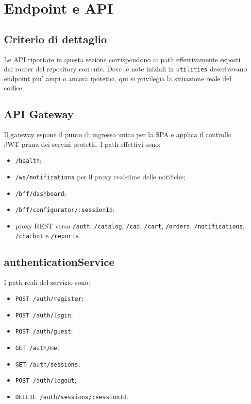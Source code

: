 \chapter{Endpoint e API}

\section{Criterio di dettaglio}

Le API riportate in questa sezione corrispondono ai path effettivamente esposti dai router del repository corrente. Dove le note iniziali in \texttt{utilities} descrivevano endpoint piu' ampi o ancora ipotetici, qui si privilegia la situazione reale del codice.

\section{API Gateway}

Il gateway espone il punto di ingresso unico per la SPA e applica il controllo JWT prima dei servizi protetti. I path effettivi sono:

\begin{itemize}
\item \texttt{/health};
\item \texttt{/ws/notifications} per il proxy real-time delle notifiche;
\item \texttt{/bff/dashboard};
\item \texttt{/bff/configurator/:sessionId};
\item proxy REST verso \texttt{/auth}, \texttt{/catalog}, \texttt{/cad}, \texttt{/cart}, \texttt{/orders}, \texttt{/notifications}, \texttt{/chatbot} e \texttt{/reports}.
\end{itemize}

\section{authenticationService}

I path reali del servizio sono:

\begin{itemize}
\item \texttt{POST /auth/register};
\item \texttt{POST /auth/login};
\item \texttt{POST /auth/guest};
\item \texttt{GET /auth/me};
\item \texttt{GET /auth/sessions};
\item \texttt{POST /auth/logout};
\item \texttt{DELETE /auth/sessions/:sessionId}.
\end{itemize}


